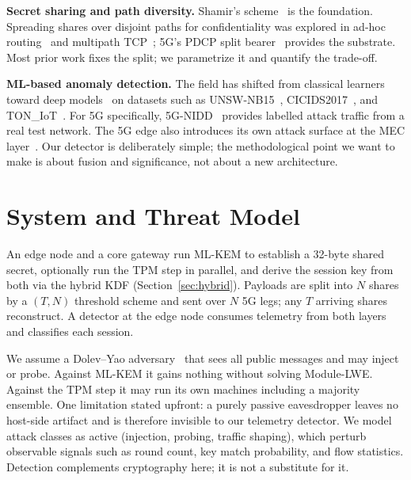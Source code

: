 \documentclass[conference]{IEEEtran}
\begin{document}
\textbf{Secret sharing and path diversity.}
Shamir's scheme~\cite{shamir1979share} is the foundation. Spreading shares over
disjoint paths for confidentiality was explored in ad-hoc
routing~\cite{lou2004spread} and multipath TCP~\cite{jadin2017securing}; 5G's PDCP
split bearer~\cite{tgpp38323} provides the substrate. Most prior work fixes the
split; we parametrize it and quantify the trade-off.

\textbf{ML-based anomaly detection.}
The field has shifted from classical learners~\cite{cover1967nearest,hastie2009elements}
toward deep models~\cite{lecun2015deep} on datasets such as UNSW-NB15~\cite{moustafa2015unsw},
CICIDS2017~\cite{sharafaldin2018toward}, and TON\_IoT~\cite{alsaedi2020toniot}. For
5G specifically, 5G-NIDD~\cite{samarakoon2022nidd} provides labelled attack traffic
from a real test network. The 5G edge also introduces its own attack surface at the
MEC layer~\cite{ranaweera2021mec,tgpp33501}. Our detector is deliberately simple;
the methodological point we want to make is about fusion and significance, not about
a new architecture.

\section{System and Threat Model}

An edge node and a core gateway run ML-KEM to establish a 32-byte shared secret,
optionally run the TPM step in parallel, and derive the session key from both via the
hybrid KDF (Section~\ref{sec:hybrid}). Payloads are split into $N$ shares by a
$(T,N)$ threshold scheme and sent over $N$ 5G legs; any $T$ arriving shares
reconstruct. A detector at the edge node consumes telemetry from both layers and
classifies each session.

We assume a Dolev--Yao adversary~\cite{dolev1983security} that sees all public
messages and may inject or probe. Against ML-KEM it gains nothing without solving
Module-LWE. Against the TPM step it may run its own machines including a majority
ensemble. One limitation stated upfront: a purely passive eavesdropper leaves no
host-side artifact and is therefore invisible to our telemetry detector. We model
attack classes as active (injection, probing, traffic shaping), which perturb
observable signals such as round count, key match probability, and flow statistics.
Detection complements cryptography here; it is not a substitute for it.
\end{document}
